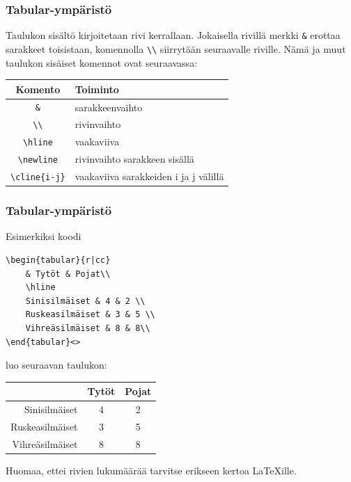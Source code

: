 \begin{frame}[fragile]
    \frametitle{Tabular-ympäristö}
    Taulukon sisältö kirjoitetaan rivi kerrallaan. Jokaisella rivillä merkki \lstinline-&- erottaa sarakkeet toisistaan, komennolla \lstinline-\\- siirrytään seuraavalle riville.  Nämä ja muut taulukon sisäiset komennot ovat seuraavassa:
    \vaihto
    \begin{table}
        \begin{small}
            \begin{tabular}{cl}
                Komento & Toiminto\\
                \hline
                \lstinline-&- & sarakkeenvaihto\\
                \hline
                \lstinline-\\- & rivinvaihto\\
                \hline
                \lstinline-\hline- & vaakaviiva \\
                \hline
                \lstinline-\newline- & rivinvaihto sarakkeen sisällä\\
                \hline
                \lstinline+\cline{i-j}+ & vaakaviiva sarakkeiden i ja j välillä\\
                \hline
            \end{tabular}
        \end{small}
    \end{table}
\end{frame}

\begin{frame}[fragile]
    \frametitle{Tabular-ympäristö}
    Esimerkiksi koodi
    \begin{lstlisting}
\begin{tabular}{r|cc}
    & Tytöt & Pojat\\
    \hline
    Sinisilmäiset & 4 & 2 \\
    Ruskeasilmäiset & 3 & 5 \\
    Vihreäsilmäiset & 8 & 8\\
\end{tabular}<>
    \end{lstlisting}
    luo seuraavan taulukon:
    \begin{sample} 
        \begin{tabular}{r|cc}
            & Tytöt & Pojat\\
            \hline
            Sinisilmäiset & 4 & 2 \\
            Ruskeasilmäiset & 3 & 5 \\
            Vihreäsilmäiset & 8 & 8\\
        \end{tabular}
    \end{sample}
    Huomaa, ettei rivien lukumäärää tarvitse erikseen kertoa \LaTeX ille.
\end{frame}

